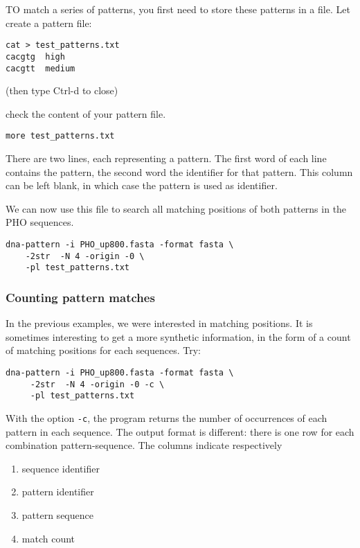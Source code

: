 TO match a series of patterns, you first need to store these patterns
in a file. Let create a pattern file:

\begin{verbatim}
cat > test_patterns.txt
cacgtg	high
cacgtt	medium
\end{verbatim}
(then type Ctrl-d to close)

check the content of your pattern file.
\begin{verbatim}
more test_patterns.txt
\end{verbatim}

There are two lines, each representing a pattern. The first word of
each line contains the pattern, the second word the identifier for
that pattern. This column can be left blank, in which case the pattern
is used as identifier.

We can now use this file to search all matching positions of both
patterns in the PHO sequences.

\begin{verbatim}
dna-pattern -i PHO_up800.fasta -format fasta \
    -2str  -N 4 -origin -0 \
    -pl test_patterns.txt
\end{verbatim}

\subsubsection{Counting pattern matches}

In the previous examples, we were interested in matching positions. It
is sometimes interesting to get a more synthetic information, in the
form of a count of matching positions for each sequences. Try:

\begin{verbatim}
dna-pattern -i PHO_up800.fasta -format fasta \ 
     -2str  -N 4 -origin -0 -c \
     -pl test_patterns.txt
\end{verbatim}

With the option \texttt{-c}, the program returns the number of
occurrences of each pattern in each sequence. The output format is
different: there is one row for each combination pattern-sequence. The
columns indicate respectively
\begin{enumerate}
\item sequence identifier
\item pattern identifier
\item pattern sequence
\item match count
\end{enumerate}

